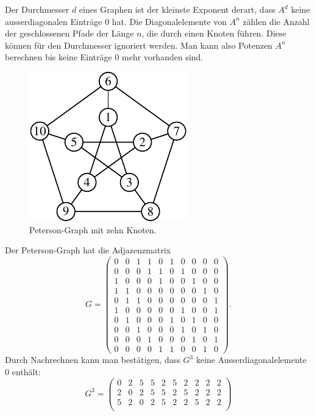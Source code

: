 Der Durchmesser $d$ eines Graphen ist der kleinste Exponent derart,
dass $A^d$ keine ausserdiagonalen Einträge $0$ hat.
Die Diagonalelemente von $A^n$ zählen die Anzahl der geschlossenen Pfade
der Länge $n$, die durch einen Knoten führen.
Diese können für den Durchmesser ignoriert werden.
Man kann also Potenzen $A^n$ berechnen bis keine Einträge $0$ mehr vorhanden
sind.

\begin{beispiel}
\begin{figure}
\centering
\includegraphics{chapters/70-graphen/images/peterson.pdf}
\caption{Peterson-Graph mit zehn Knoten.
\label{buch:figure:peterson}}
\end{figure}
Der Peterson-Graph hat die Adjazenzmatrix
\[
G
=
\begin{pmatrix}
 0& 0& 1& 1& 0& 1& 0& 0& 0& 0\\ %
 0& 0& 0& 1& 1& 0& 1& 0& 0& 0\\ %
 1& 0& 0& 0& 1& 0& 0& 1& 0& 0\\ %
 1& 1& 0& 0& 0& 0& 0& 0& 1& 0\\ %
 0& 1& 1& 0& 0& 0& 0& 0& 0& 1\\ %
 1& 0& 0& 0& 0& 0& 1& 0& 0& 1\\ %
 0& 1& 0& 0& 0& 1& 0& 1& 0& 0\\ %
 0& 0& 1& 0& 0& 0& 1& 0& 1& 0\\ %
 0& 0& 0& 1& 0& 0& 0& 1& 0& 1\\ %
 0& 0& 0& 0& 1& 1& 0& 0& 1& 0   %
\end{pmatrix}.
\]
Durch Nachrechnen kann man bestätigen, dass $G^3$ keine
Ausserdiagonalelemente $0$ enthält:
\[
G^3
=
\begin{pmatrix}
 0& 2& 5& 5& 2& 5& 2& 2& 2& 2\\
 2& 0& 2& 5& 5& 2& 5& 2& 2& 2\\
 5& 2& 0& 2& 5& 2& 2& 5& 2& 2\\

\end{pmatrix}\]
\end{beispiel}
